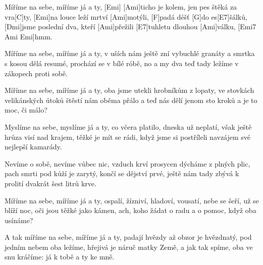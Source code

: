 
\sloka
[Ami]Míříme na sebe, míříme já a ty, [Emi]
[Ami]ticho je kolem, jen pes štěká za vra[C]ty,
[Emi]na louce leží mrtví [Ami]motýli,
[F]padá déšť [G]do es[E7]šálků,
[Dmi]jsme poslední dva, kteří [Ami]přežili
[E7]tuhletu dlouhou [Ami]válku, [Emi7 Ami Emi]hmm.

\sloka
Míříme na sebe, míříme já a ty,
v uších nám ještě zní vybuchlé granáty
a smrtka s kosou dělá resumé, prochází se v bílé róbě,
no a my dva teď tady ležíme v zákopech proti sobě.

\sloka
Míříme na sebe, míříme já a ty,
oba jsme utekli hrobníkům z lopaty,
ve stovkách velikánských útoků štěstí nám oběma přálo
a teď nás dělí jenom sto kroků a je to moc, či málo?

\sloka
Myslíme na sebe, myslíme já a ty,
co včera platilo, dneska už neplatí,
však ještě hrůza visí nad krajem, těžké je mít se rádi,
když jsme si postříleli navzájem své nejlepší kamarády.

\sloka
Nevíme o sobě, nevíme vůbec nic,
vzduch krví prosycen dýcháme z plných plic,
pach smrti pod kůží je zarytý, končí se dějství prvé,
ještě nám tady zbývá k prolití dvakrát šest litrů krve.

\sloka
Míříme na sebe, míříme já a ty,
ospalí, žízniví, hladoví, vousatí,
nebe se šeří, už se blíží noc, oči jsou těžké jako kámen,
ach, koho žádat o radu a o pomoc, když oba usínáme?

\sloka
A tak míříme na sebe, míříme já a ty,
padají hvězdy až obzor je hvězdnatý,
pod jedním nebem oba ležíme, hřejivá je náruč matky Země,
a jak tak spíme, oba ve snu kráčíme: já k tobě a ty ke mně.
